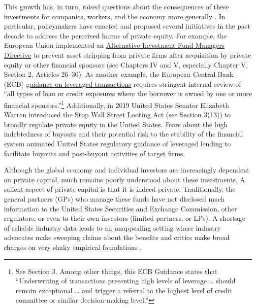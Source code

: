 This growth has, in turn, raised questions about the consequences of these investments for companies, workers, and the economy more generally \citep{privatecapitalresearchinstitute2017}. In particular, policymakers have enacted and proposed several initiatives in the past decade to address the perceived harms of private equity. For example, the European Union implemented an \href{https://eur-lex.europa.eu/legal-content/EN/TXT/PDF/?uri=CELEX:32011L0061\&from=EN}{Alternative Investment Fund Managers Directive} to prevent asset stripping from private firms after acquisition by private equity or other financial sponsors (see Chapters IV and V, especially Chapter V, Section 2, Articles 26--30). As another example, the European Central Bank (ECB) \href{https://www.bankingsupervision.europa.eu/ecb/pub/pdf/ssm.leveraged_transactions_guidance_201705.en.pdf}{guidance on leveraged transactions} requires stringent internal review of ``all types of loan or credit exposures where the borrower is owned by one or more financial sponsors.''\footnote{See Section 3. Among other things, this ECB Guidance states that ``Underwriting of transactions presenting high levels of leverage \ldots{} should remain exceptional \ldots{} and trigger a referral to the highest level of credit committee or similar decision-making level.''} Additionally, in 2019 United States Senator Elizabeth Warren introduced the \href{https://www.warren.senate.gov/imo/media/doc/2019.7.17\%20Stop\%20Wall\%20Street\%20Looting\%20Act\%20Text.pdf}{Stop Wall Street Looting Act} (see Section 3(13)) to broadly regulate private equity in the United States. Fears about the high indebtedness of buyouts and their potential risk to the stability of the financial system animated United States regulatory guidance of leveraged lending to facilitate buyouts and post-buyout activities of target firms.

Although the global economy and individual investors are increasingly dependent on private capital, much remains poorly understood about these investments. A salient aspect of private capital is that it is indeed private. Traditionally, the general partners (GPs) who manage these funds have not disclosed much information to the United States Securities and Exchange Commission, other regulators, or even to their own investors (limited partners, or LPs). A shortage of reliable industry data leads to an unappealing setting where industry advocates make sweeping claims about the benefits and critics make broad charges on very shaky empirical foundations \citep{kaplan2017}.

